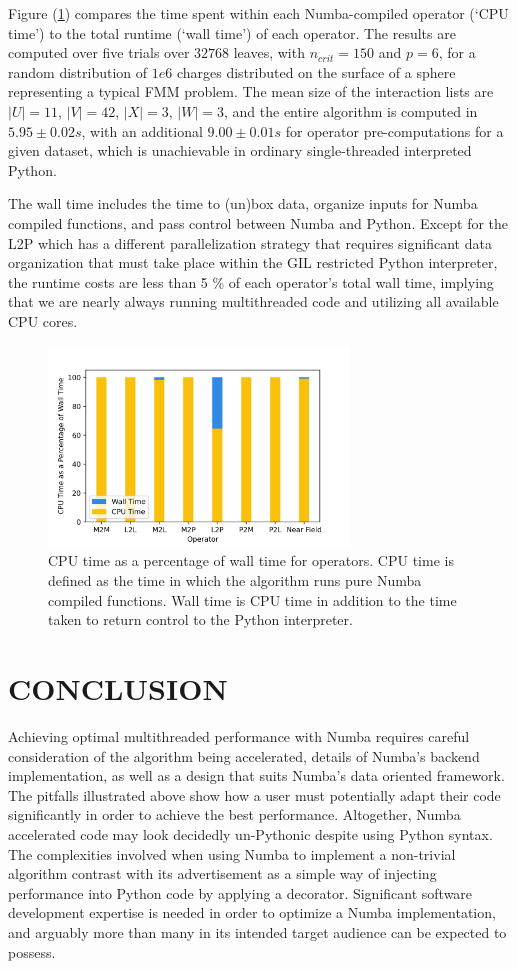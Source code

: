 \documentclass{IEEEcsmag}
\begin{document}
Figure (\ref{fig:cpu_wall}) compares the time spent within each Numba-compiled operator (`CPU time') to the total runtime (`wall time') of each operator. The results are computed over five trials over $32768$ leaves, with $n_{crit}=150$ and $p=6$, for a random distribution of $1e6$ charges distributed on the surface of a sphere representing a typical FMM problem. The mean size of the interaction lists are $|U|=11$, $|V|=42$, $|X|=3$, $|W|=3$, and the entire algorithm is computed in $5.95 \pm 0.02 s$, with an additional $9.00 \pm 0.01 s$ for operator pre-computations for a given dataset, which is unachievable in ordinary single-threaded interpreted Python.

The wall time includes the time to (un)box data, organize inputs for Numba compiled functions, and pass control between Numba and Python. Except for the L2P which has a different parallelization strategy that requires significant data organization that must take place within the GIL restricted Python interpreter, the runtime costs are less than 5 \% of each operator's total wall time, implying that we are nearly always running multithreaded code and utilizing all available CPU cores. 

 \begin{figure}
	\centerline{\includegraphics[width=8cm]{figures/cpu_wall.png}}
    \caption{CPU time as a percentage of wall time for operators. CPU time is defined as the time in which the algorithm runs pure Numba compiled functions. Wall time is CPU time in addition to the time taken to return control to the Python interpreter. } 
	\label{fig:cpu_wall}
\end{figure}

\section{CONCLUSION}

Achieving optimal multithreaded performance with Numba requires careful consideration of the algorithm being accelerated, details of Numba's backend implementation, as well as a design that suits Numba's data oriented framework. The pitfalls illustrated above show how a user must potentially adapt their code significantly in order to achieve the best performance. Altogether, Numba accelerated code may look decidedly un-Pythonic despite using Python syntax. The complexities involved when using Numba to implement a non-trivial algorithm contrast with its advertisement as a simple way of injecting performance into Python code by applying a decorator. Significant software development expertise is needed in order to optimize a Numba implementation, and arguably more than many in its intended target audience can be expected to possess. 
\end{document}
